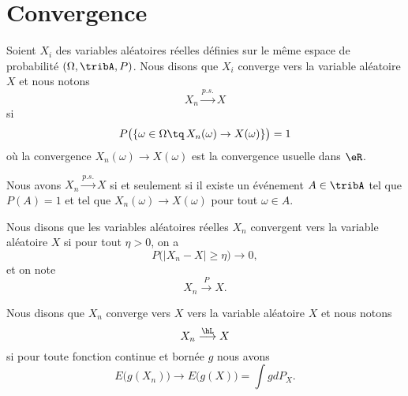 \section{Convergence}

Soient \( X_i\) des variables aléatoires réelles définies sur le même espace de probabilité \( (\Omega,\tribA,P)\). Nous disons que \( X_i\) converge  vers la variable aléatoire \( X\) et nous notons 
\begin{equation}
    X_n\stackrel{p.s.}{\longrightarrow}X
\end{equation}
si
\begin{equation}
    P\big( \{ \omega\in\Omega\tq\,X_n(\omega)\to X(\omega) \} \big)=1
\end{equation}
où la convergence \( X_n(\omega)\to X(\omega)\) est la convergence usuelle dans \( \eR\).

\begin{lemma}
    Nous avons \( X_n\stackrel{p.s.}{\longrightarrow}X\) si et seulement si il existe un événement \( A\in\tribA\) tel que \( P(A)=1\) et tel que \( X_n(\omega)\to X(\omega)\) pour tout \( \omega\in A\).
\end{lemma}

Nous disons que les variables aléatoires réelles \( X_n\) convergent  vers la variable aléatoire \( X\) si pour tout \( \eta>0\), on a
\begin{equation}
    P\big( | X_n-X |\geq \eta \big)\to 0,
\end{equation}
et on note
\begin{equation}
    X_n\stackrel{P}{\longrightarrow}X.
\end{equation}

Nous disons que \( X_n\) converge vers \( X\)  vers la variable aléatoire \( X\) et nous notons
\begin{equation}
    X_n\stackrel{\hL}{\longrightarrow}X
\end{equation}
si pour toute fonction continue et bornée \( g\) nous avons
\begin{equation}
    E\big( g(X_n) \big)\to E\big( g(X) \big)=\int gdP_X.
\end{equation}


